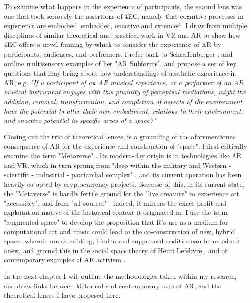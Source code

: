 To examine what happens in the experience of participants, the second lens was one that took seriously the assertions of 4EC, namely that cognitive processes in experience are embodied, embedded, enactive and extended. I draw from multiple disciplines of similar theoretical and practical work in VR and AR to show how 4EC offers a novel framing by which to consider the experience of AR by participants, audiences, and performers. I refer back to Schraffenberger \citeyearpar{schraffenberger2018}, and outline multisensory examples of her "AR Subforms", and propose a set of key questions that may bring about new understandings of aesthetic experience in AR; e.g. \textit{"If a participant of an AR musical experience, or a performer of an AR musical instrument engages with this plurality of perceptual mediations, might the addition, removal, transformation, and completion of aspects of the environment have the potential to alter their own embodiment, relations to their environment, and enactive potential in specific areas of a space?"}

Closing out the trio of theoretical lenses, is a grounding of the aforementioned consequence of AR for the experience and construction of "space". I first critically examine the term "Metaverse" \citep{stephenson1992}. Its modern-day origin is in technologies like AR and VR, which in turn sprung from "deep within the military and Western - scientific - industrial - patriarchal complex" \cite{davies2004}, and its current operation has been heavily co-opted by cryptocurrency projects. Because of this, in its current state, the "Metaverse" is hardly fertile ground for the "live creature" to experience art "accessibly", and from "all sources" \citep{dewey1934,leddy2021}, indeed, it mirrors the exact profit and exploitation motive of the historical context it originated in. I use the term "augmented space" \citep{manovich2006} to develop the proposition that R’s use as a medium for computational art and music could lead to the co-construction of new, hybrid spaces wherein novel, existing, hidden and suppressed realities can be acted out anew, and ground this in the social space theory of Henri Lefebvre \citeyearpar{lefebvre1991}, and of contemporary examples of AR activism \citep{veenhof2010,thiel2011,thiel2018,skwarek2018}.

In the next chapter I will outline the methodologies taken within my research, and draw links between historical and contemporary uses of AR, and the theoretical lenses I have proposed here.